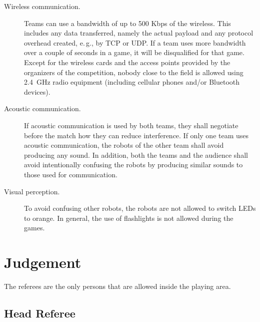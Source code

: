 \documentclass[12pt]{article}
\newcommand{\eg}{\mbox{e.\,g.}\xspace}
\begin{document}
\begin{description}

\item[Wireless communication.] Teams can use a bandwidth of up to 500 Kbps of the wireless. This includes any data transferred, namely the actual payload and any protocol overhead created, \eg, by TCP or UDP. If a team uses more bandwidth over a couple of seconds in a game, it will be disqualified for that game. Except for the wireless cards and the access points provided by the organizers of the competition, nobody close to the field is allowed using 2.4~GHz radio equipment (including cellular phones and/or Bluetooth devices).

\item[Acoustic communication.] If acoustic communication is used by both teams, they shall negotiate before the match how they can reduce interference. If only one team uses acoustic communication, the robots of the other team shall avoid producing any sound. In addition, both the teams and the audience shall avoid intentionally confusing the robots by producing similar sounds to those used for communication.

\item[Visual perception.] To avoid confusing other robots, the robots are not allowed to switch LEDs to orange. In general, the use of flashlights is not allowed during the games.

\end{description}

\section{Judgement}

The referees are the only persons that are allowed inside the playing area.

\subsection{Head Referee}
\end{document}
